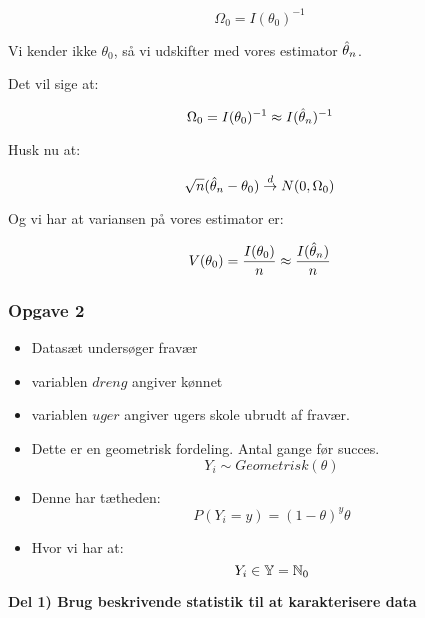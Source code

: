 \begin{equation}
    \Omega_0 = I(\theta_0)^{-1}
\end{equation}

Vi kender ikke $\theta_0$, så vi udskifter med vores estimator $\hat{\theta}_n$.

Det vil sige at:

\begin{equation}
    \Omega_0 = I(\theta_0)^{-1} \approx I(\hat{\theta}_n)^{-1}
\end{equation}

Husk nu at:

\begin{equation}
    \sqrt{n}(\hat{\theta}_n - \theta_0) \overset{d}{\rightarrow} N(0, \Omega_0)
\end{equation}

Og vi har at variansen på vores estimator er:

\begin{equation}
    V(\theta_0) = \frac{I(\theta_0)}{n} \approx  \frac{I(\hat{\theta}_n)}{n}
\end{equation}


\subsubsection{Opgave 2}

\begin{itemize}
    \item Datasæt undersøger fravær
    \item variablen $dreng$ angiver kønnet
    \item variablen $uger$ angiver ugers skole ubrudt af fravær.
    \item Dette er en geometrisk fordeling. Antal gange før succes.
    \begin{equation}
        Y_i \sim Geometrisk(\theta)
    \end{equation}
    \item Denne har tætheden:
    \begin{equation}
        P(Y_i = y) = (1- \theta)^y \theta
    \end{equation}
    \item Hvor vi har at:
    \begin{equation}
        Y_i \in \mathbb{Y} = \mathbb{N}_0
    \end{equation}
\end{itemize}

\textbf{Del 1) Brug beskrivende statistik til at karakterisere data}

